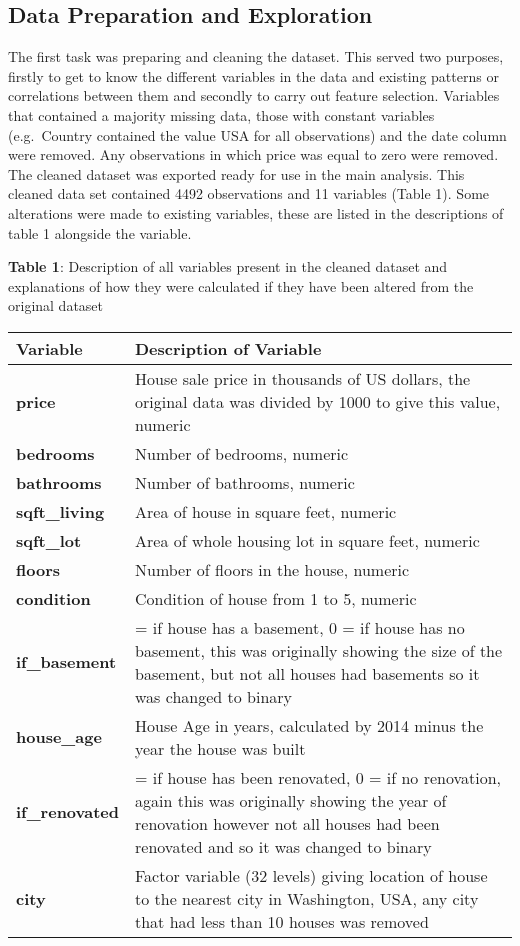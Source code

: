 \documentclass[
]{article}
\begin{document}
\hypertarget{data-preparation-and-exploration}{%
\subsection{Data Preparation and
Exploration}\label{data-preparation-and-exploration}}

The first task was preparing and cleaning the dataset. This served two
purposes, firstly to get to know the different variables in the data and
existing patterns or correlations between them and secondly to carry out
feature selection. Variables that contained a majority missing data,
those with constant variables (e.g.~Country contained the value USA for
all observations) and the date column were removed. Any observations in
which price was equal to zero were removed. The cleaned dataset was
exported ready for use in the main analysis. This cleaned data set
contained 4492 observations and 11 variables (Table 1). Some alterations
were made to existing variables, these are listed in the descriptions of
table 1 alongside the variable.

\textbf{Table 1}: Description of all variables present in the cleaned
dataset and explanations of how they were calculated if they have been
altered from the original dataset

\begin{tabular}{|>{}l|>{\raggedright\arraybackslash}p{12cm}|}
\hline
\textbf{Variable} & \textbf{Description of Variable}\\
\hline
\textbf{price} & House sale price in thousands of US dollars, the original data was divided by 1000 to give this value, numeric\\
\hline
\textbf{bedrooms} & Number of bedrooms, numeric\\
\hline
\textbf{bathrooms} & Number of bathrooms, numeric\\
\hline
\textbf{sqft\_living} & Area of house in square feet, numeric\\
\hline
\textbf{sqft\_lot} & Area of whole housing lot in square feet, numeric\\
\hline
\textbf{floors} & Number of floors in the house, numeric\\
\hline
\textbf{condition} & Condition of house from 1 to 5, numeric\\
\hline
\textbf{if\_basement} & 1 = if house has a basement, 0 = if house has no basement, this was originally showing the size of the basement, but not all houses had basements so it was changed to binary\\
\hline
\textbf{house\_age} & House Age in years, calculated by 2014 minus the year the house was built\\
\hline
\textbf{if\_renovated} & 1 = if house has been renovated, 0 = if no renovation, again this was originally showing the year of renovation however not all houses had been renovated and so it was changed to binary\\
\hline
\textbf{city} & Factor variable (32 levels) giving location of house to the nearest city in Washington, USA, any city that had less than 10 houses was removed\\
\hline
\end{tabular}
\end{document}
